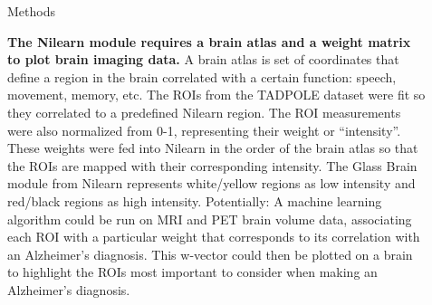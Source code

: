 \documentclass[final]{beamer}
\newlength{\sepwid}
\newlength{\onecolwid}
\newlength{\twocolwid}
\begin{document}
\begin{frame}[t]
\begin{columns}[t]
\begin{column}{\onecolwid}
        
        
    
    \end{column} %
    
    \begin{column}{\sepwid}\end{column} %
    
    \begin{column}{\twocolwid} %
    
       \begin{alertblock}{Methods}
        
            \textbf{The Nilearn module requires a brain atlas and a weight matrix to plot brain imaging data.} A brain atlas is set of coordinates that define a region in the brain correlated with a certain function: speech, movement, memory, etc. The ROIs from the TADPOLE dataset were fit so they correlated to a predefined Nilearn region. The ROI measurements were also normalized from 0-1, representing their weight or “intensity”. These weights were fed into Nilearn in the order of the brain atlas so that the ROIs are mapped with their corresponding intensity. The Glass Brain module from Nilearn represents white/yellow regions as low intensity and red/black regions as high intensity.   
            \linebreak
            \linebreak Potentially: A machine learning algorithm could be run on MRI and PET brain volume data, associating each ROI with a particular weight that corresponds to its correlation with an Alzheimer’s diagnosis. This w-vector could then be plotted on a brain to highlight the ROIs most important to consider when making an Alzheimer’s diagnosis. 
        \end{alertblock}
        
        


\end{column}
\end{columns}
\end{frame}
\end{document}
